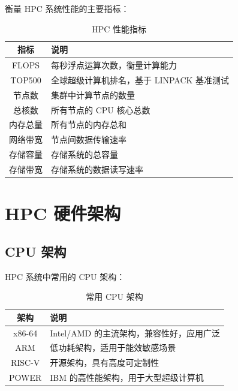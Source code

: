 \documentclass[12pt,UTF8]{ctexbook}
\begin{document}
衡量 HPC 系统性能的主要指标：

\begin{table}[htbp]
    \centering
    \caption{HPC 性能指标}
    \begin{tabular}{|c|p{8cm}|}
        \hline
        \textbf{指标} & \textbf{说明} \\
        \hline
        FLOPS & 每秒浮点运算次数，衡量计算能力 \\
        \hline
        TOP500 & 全球超级计算机排名，基于 LINPACK 基准测试 \\
        \hline
        节点数 & 集群中计算节点的数量 \\
        \hline
        总核数 & 所有节点的 CPU 核心总数 \\
        \hline
        内存总量 & 所有节点的内存总和 \\
        \hline
        网络带宽 & 节点间数据传输速率 \\
        \hline
        存储容量 & 存储系统的总容量 \\
        \hline
        存储带宽 & 存储系统的数据读写速率 \\
        \hline
    \end{tabular}
\end{table}

\chapter{HPC 硬件架构}
\label{chap:hpc_hardware}

\section{CPU 架构}
\label{sec:cpu_architecture}

HPC 系统中常用的 CPU 架构：

\begin{table}[htbp]
    \centering
    \caption{常用 CPU 架构}
    \begin{tabular}{|c|p{8cm}|}
        \hline
        \textbf{架构} & \textbf{说明} \\
        \hline
        x86-64 & Intel/AMD 的主流架构，兼容性好，应用广泛 \\
        \hline
        ARM & 低功耗架构，适用于能效敏感场景 \\
        \hline
        RISC-V & 开源架构，具有高度可定制性 \\
        \hline
        POWER & IBM 的高性能架构，用于大型超级计算机 \\
        \hline
    \end{tabular}
\end{table}
\end{document}
